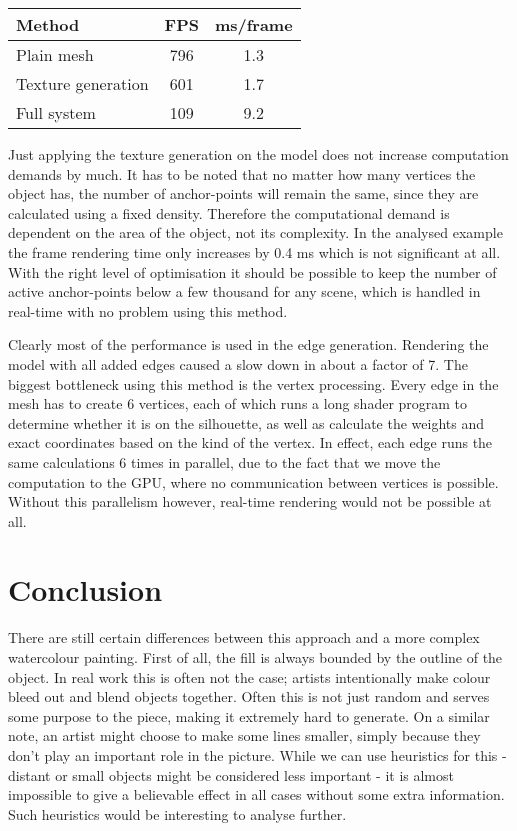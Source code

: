 \documentclass[a4paper, 12pt]{article}
\begin{document}
\begin{table}[H]
\centering
\begin{tabular}{|l|c|c|}
\hline
Method             & FPS & ms/frame \\
\hline
Plain mesh         & 796 & 1.3      \\
Texture generation & 601 & 1.7      \\
Full system        & 109 & 9.2      \\
\hline
\end{tabular}
\end{table}

Just applying the texture generation on the model does not increase computation demands by much. It has to be noted that no matter how many vertices the object has, the number of anchor-points will remain the same, since they are calculated using a fixed density. Therefore the computational demand is dependent on the area of the object, not its complexity. In the analysed example the frame rendering time only increases by 0.4 ms which is not significant at all. With the right level of optimisation it should be possible to keep the number of active anchor-points below a few thousand for any scene, which is handled in real-time with no problem using this method.

Clearly most of the performance is used in the edge generation. Rendering the model with all added edges caused a slow down in about a factor of 7. The biggest bottleneck using this method is the vertex processing. Every edge in the mesh has to create 6 vertices, each of which runs a long shader program to determine whether it is on the silhouette, as well as calculate the weights and exact coordinates based on the kind of the vertex. In effect, each edge runs the same calculations 6 times in parallel, due to the fact that we move the computation to the GPU, where no communication between vertices is possible. Without this parallelism however, real-time rendering would not be possible at all.



\section{Conclusion}
There are still certain differences between this approach and a more complex watercolour painting. First of all, the fill is always bounded by the outline of the object. In real work this is often not the case; artists intentionally make colour bleed out and blend objects together. Often this is not just random and serves some purpose to the piece, making it extremely hard to generate. On a similar note, an artist might choose to make some lines smaller, simply because they don't play an important role in the picture. While we can use heuristics for this - distant or small objects might be considered less important - it is almost impossible to give a believable effect in all cases without some extra information. Such heuristics would be interesting to analyse further.
\end{document}
